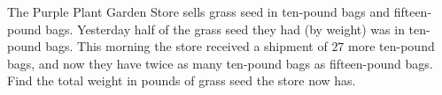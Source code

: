 The Purple Plant Garden Store sells grass seed in ten-pound bags and fifteen-pound bags. Yesterday half of the grass seed they had (by weight) was in ten-pound bags. This morning the store received a shipment of $27$ more ten-pound bags, and now they have twice as many ten-pound bags as fifteen-pound bags. Find the total weight in pounds of grass seed the store now has.
